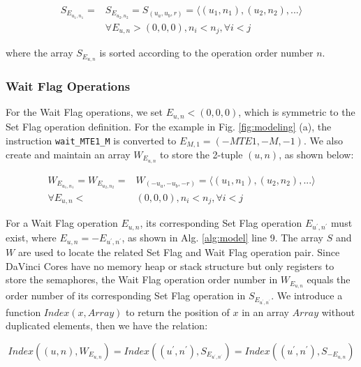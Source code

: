 \documentclass[12pt]{extbook}
\begin{document}
\begin{equation}
\begin{aligned}
S_{E_{u_{1}, n_{1}}} = & S_{E_{u_{2}, n_{2}}} = S_{(u_{a}, u_{b}, r)} = \langle (u_{1}, n_{1}), (u_{2}, n_{2}), ... \rangle \\
& \forall E_{u, n} > (0, 0, 0), n_{i} < n_{j}, \forall i < j
\end{aligned}
\end{equation}

where the array $S_{E_{u, n}}$ is sorted according to the operation order number $n$.

\subsubsection{Wait Flag Operations}

For the Wait Flag operations, we set $E_{u, n} < (0, 0, 0)$, which is symmetric to the Set Flag operation definition. For the example in Fig. \ref{fig:modeling} (a), the instruction \verb|wait_MTE1_M| is converted to $E_{M, 1} = (-MTE1, -M, -1)$. We also create and maintain an array $W_{E_{u, n}}$ to store the 2-tuple $(u, n)$, as shown below:

\begin{equation}
\begin{aligned}
W_{E_{u_{1}, n_{1}}} = W_{E_{u_{2}, n_{2}}} = & W_{(-u_{a}, -u_{b}, -r)} = \langle (u_{1}, n_{1}), (u_{2}, n_{2}), ... \rangle \\
\forall E_{u, n} < & (0, 0, 0), n_{i} < n_{j}, \forall i < j
\end{aligned}
\end{equation}

For a Wait Flag operation $E_{u, n}$, its corresponding Set Flag operation $E_{u^{\prime}, n^{\prime}}$ must exist, where $E_{u, n} = - E_{u^{\prime}, n^{\prime}}$, as shown in Alg. \ref{alg:model} line 9. The array $S$ and $W$ are used to locate the related Set Flag and Wait Flag operation pair. Since DaVinci Cores have no memory heap or stack structure but only registers to store the semaphores, the Wait Flag operation order number in $W_{E_{u, n}}$ equals the order number of its corresponding Set Flag operation in $S_{E_{u^{\prime}, n^{\prime}}}$. We introduce a function $Index(x, Array)$ to return the position of $x$ in an array $Array$ without duplicated elements, then we have the relation:

\begin{equation}
Index((u, n), W_{E_{u, n}}) = 
    Index((u^{\prime}, n^{\prime}), S_{E_{u^{\prime}, n^{\prime}}}) = 
    Index((u^{\prime}, n^{\prime}), S_{- E_{u, n}})
\end{equation}
\end{document}
